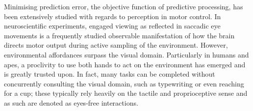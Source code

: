 Minimising prediction error, the objective function of predictive processing, has been extensively studied with regards to perception in motor control. In neuroscientific experiments, engaged viewing as reflected in saccadic eye movements is a frequently studied observable manifestation of how the brain directs motor output during active sampling of the environment. However, environmental affordances surpass the visual domain. Particularly in humans and apes, a proclivity to use both hands to act on the environment has emerged and is greatly trusted upon. In fact, many tasks can be completed without concurrently consulting the visual domain, such as typewriting or even reaching for a cup; these typically rely heavily on the tactile and proprioceptive sense and as such are denoted as eyes-free interactions.








